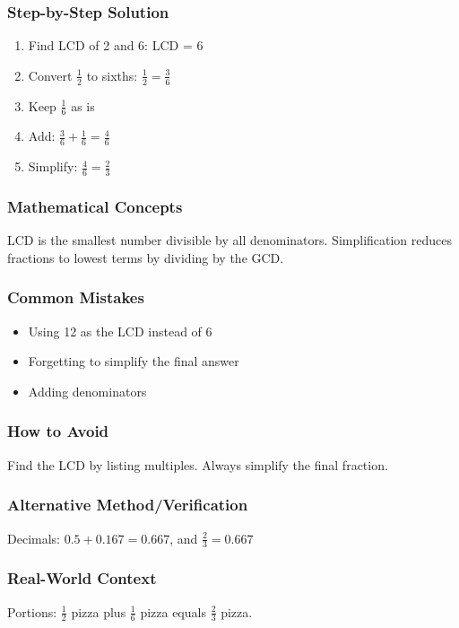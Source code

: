 \documentclass[12pt,a4paper]{article}
\begin{document}
\subsubsection*{Step-by-Step Solution}
\begin{enumerate}
    \item Find LCD of 2 and 6: LCD = 6
    \item Convert $\frac{1}{2}$ to sixths: $\frac{1}{2} = \frac{3}{6}$
    \item Keep $\frac{1}{6}$ as is
    \item Add: $\frac{3}{6} + \frac{1}{6} = \frac{4}{6}$
    \item Simplify: $\frac{4}{6} = \frac{2}{3}$
\end{enumerate}

\subsubsection*{Mathematical Concepts}
LCD is the smallest number divisible by all denominators. Simplification reduces fractions to lowest terms by dividing by the GCD.

\subsubsection*{Common Mistakes}
\begin{itemize}
    \item Using 12 as the LCD instead of 6
    \item Forgetting to simplify the final answer
    \item Adding denominators
\end{itemize}

\subsubsection*{How to Avoid}
Find the LCD by listing multiples. Always simplify the final fraction.

\subsubsection*{Alternative Method/Verification}
Decimals: $0.5 + 0.167 = 0.667$, and $\frac{2}{3} = 0.667$ 

\subsubsection*{Real-World Context}
Portions: $\frac{1}{2}$ pizza plus $\frac{1}{6}$ pizza equals $\frac{2}{3}$ pizza.
\end{document}
